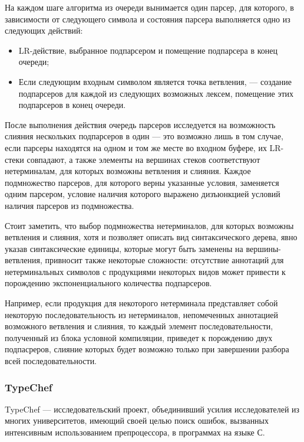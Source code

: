 На каждом шаге алгоритма из очереди вынимается один парсер, для которого, в зависимости от следующего символа и состояния парсера выполняется одно из следующих действий:

\begin{itemize}
\item LR-действие, выбранное подпарсером и помещение подпарсера в конец очереди;
\item Если следующим входным символом является точка ветвления, --- создание подпарсеров для каждой из следующих возможных лексем, помещение этих подпарсеров в конец очереди.
\end{itemize}

После выполнения действия очередь парсеров исследуется на возможность слияния нескольких подпарсеров в один --- это возможно лишь в том случае, если парсеры находятся на одном и том же месте во входном буфере, их LR-стеки совпадают, а также элементы на вершинах стеков соответствуют нетерминалам, для которых возможны ветвления и слияния. Каждое подмножество парсеров, для которого верны указанные условия, заменяется одним парсером, условие наличия которого выражено дизъюнкцией условий наличия парсеров из подмножества.

Стоит заметить, что выбор подмножества нетерминалов, для которых возможны ветвления и слияния, хотя и позволяет описать вид синтаксического дерева, явно указав синтаксические единицы, которые могут быть заменены на вершины-ветвления, привносит также некоторые сложности: отсутствие аннотаций для нетерминальных символов с продукциями некоторых видов может привести к порождению экспоненциального количества подпарсеров. 

Например, если продукция для некоторого нетерминала представляет собой некоторую последовательность из нетерминалов, непомеченных аннотацией возможного ветвления и слияния, то каждый элемент последовательности, полученный из блока условной компиляции, приведет к порождению двух подпасреров, слияние которых будет возможно только при завершении разбора всей последовательности. 

\subsubsection{TypeChef}

TypeChef --- исследовательский проект, объединивший усилия исследователей из многих университетов, имеющий своей целью поиск ошибок, вызванных интенсивным использованием препроцессора, в программах на языке С.

